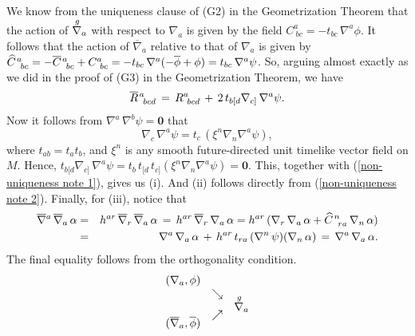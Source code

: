 \documentclass [12] {article}
\theoremstyle{plain}
\numberwithin{figure}{subsection}
\numberwithin{proposition}{subsection}
\begin{document}
{We know from the uniqueness clause of (G2) in the Geometrization Theorem that the action of $\stackrel{g \hspace{.4em}}{\nabla_a}$ with respect to $\nabla_a$ is given by the field  $C^a_{\ bc}  =  -t_{bc} \, \nabla^a \phi$.  It follows that the action of $\overline{\nabla}_a$ relative to that of $\nabla_a$ is given by  $\widehat{C}\hspace{.1em}^a_{\ bc} = -\overline{C}\hspace{.1em}^a_{\ bc} + C^a_{\ bc} =  -t_{bc} \, \nabla^a  (-\overline{\phi} + \phi) =   t_{bc} \, \nabla^a  \psi$. So, arguing almost exactly as we did  in the proof of (G3) in the Geometrization Theorem, we have
\begin{equation} \label{non-uniqueness note 1}
\overline{R}\hspace{.1em}^a_{\ bcd} \, = \,  R^a_{\ bcd}  \, + \,  2 \, t_{b[d}  \nabla_{c]} \,  \nabla^a \psi. 
\end{equation}
Now it follows from $\nabla^a \, \nabla^b \psi = \mathbf{0}$ that
\begin{equation} \label{non-uniqueness note 2}
\nabla_c \, \nabla^a \psi  = t_c \, (\xi^n \nabla_n  \nabla^a \psi),
\end{equation}
where $t_{ab} = t_a t_b$, and  $\xi^n$ is any smooth future-directed unit timelike vector field on $M$.  Hence, $t_{b[d}  \nabla_{c]} \,  \nabla^a \psi = t_b \,  t_{[d} \,t_{c]} (\xi^n \nabla_n  \nabla^a \psi) = \mathbf{0}$.  This, together with (\ref{non-uniqueness note 1}), gives us (i).   And (ii) follows directly from (\ref{non-uniqueness note 2}). Finally, for (iii), notice that
\begin{eqnarray*}
\overline{\nabla}{}^a \, \overline{\nabla}_a \, \alpha   &=&  h^{ar}  \, \overline{\nabla}_r \, \overline{\nabla}_a \, \alpha  \, = \, h^{ar} \,  \overline{\nabla}_r \, \nabla_a  \, \alpha  = h^{ar} \, (\nabla_r \, \nabla_a \, \alpha + \widehat{C}\hspace{.1em}^n_{\ ra} \, \nabla_n \, \alpha ) \\ 
 {} &=& \nabla^a \, \nabla_a \, \alpha \, + \,  h^{ar} \,  t_{ra} \, (\nabla^n \, \psi) (\nabla_n \, \alpha) \, = \, \nabla^a \, \nabla_a \, \alpha. 
\end{eqnarray*}
 The final equality follows from the orthogonality condition.}
 \nopagebreak[3]
  \[
\begin{array}{rcl}
(\nabla_a, \phi)  &{} & {}  \\
\vspace{-.5em}
{} & \searrow &{}  \\
\vspace{-.5em}
{} & {} &\stackrel{g \hspace{.4em}}{\nabla_a} \\
\vspace{-.5em}
{} & \nearrow &{}  \\ 
\vspace{-.5em}
(\overline{\nabla}_a, \overline{\phi})  &{} & {}  
\end{array}
\] 
\end{document}
